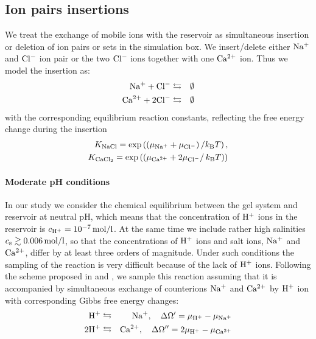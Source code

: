 \documentclass{elsarticle}
\begin{document}
\subsection{Ion pairs insertions\label{sec: ion insertions}}
We treat the exchange of mobile ions with the reservoir as simultaneous insertion or deletion
of ion pairs or sets in the simulation box.
We insert/delete either $\mathrm{Na^+}$ and $\mathrm{Cl^-}$ ion pair or the two $\mathrm{Cl^-}$ ions together with one $\mathrm{Ca^{2+}}$ ion.
Thus we model the insertion as:
\begin{eqnarray}
    \mathrm{Na^+} +  \mathrm{Cl^-} &\leftrightarrows& \emptyset\label{eq:nacl} \\
    \mathrm{Ca^{2+}} + 2\mathrm{Cl^-} &\leftrightarrows& \emptyset \label{eq:cacl}
\end{eqnarray}
with the corresponding equilibrium reaction constants, reflecting the free energy change during the insertion
\begin{eqnarray*}
    K_\mathrm{NaCl}     = \exp\left(\left(\mu_{\mathrm{Na^+}}+ \mu_{\mathrm{Cl^-}} \right) /k_\mathrm{B}T\right), \\
    K_{\mathrm{CaCl}_2} = \exp\left(\left(\mu_{\mathrm{Ca^{2+}}}+2\mu_{\mathrm{Cl^-}} \right /k_\mathrm{B}T\right))
\end{eqnarray*}

\paragraph{Moderate pH conditions\label{sec: moderate pH conditions}}
In our study we consider the chemical equilibrium between the gel system and reservoir at neutral pH,
which means that the concentration of $\mathrm{H^+}$ ions in the reservoir is $c_\h=\unit[10^{-7}]{mol/l}$.
At the same time we include rather high salinities \ie $\cs \gtrsim \unit[0.006]{mol/l}$,
so that the concentrations of $\mathrm{H^+}$ ions and salt ions, $\mathrm{Na^+}$ and $\mathrm{Ca^{2+}}$, differ by at least three orders of magnitude.
Under such conditions the sampling of the reaction 
is very difficult because of the lack of $\mathrm{H^+}$ ions.
Following the scheme proposed in \cite{Landsgesel2020} and \cite{Rud2020},
we sample this reaction assuming that
it is accompanied by simultaneous exchange of counterions $\mathrm{Na^+}$ and $\mathrm{Ca^{2+}}$ by $\mathrm{H^+}$ ion
with corresponding Gibbs free energy changes\cite{Smith1991}:
\begin{eqnarray}
     \mathrm{H^+}&\leftrightarrows&\mathrm{Na^+}, \quad \Delta\Omega' = \mu_{\mathrm{H^+}}-\mu_{\mathrm{Na^+}}   \label{eq:hna} \\
    2\mathrm{H^+}&\leftrightarrows&\mathrm{Ca^{2+}}, \quad \Delta\Omega'' = 2\mu_{\mathrm{H^+}}-\mu_{\mathrm{Ca^{2+}}} \label{eq:cacl}
\end{eqnarray}
\end{document}
